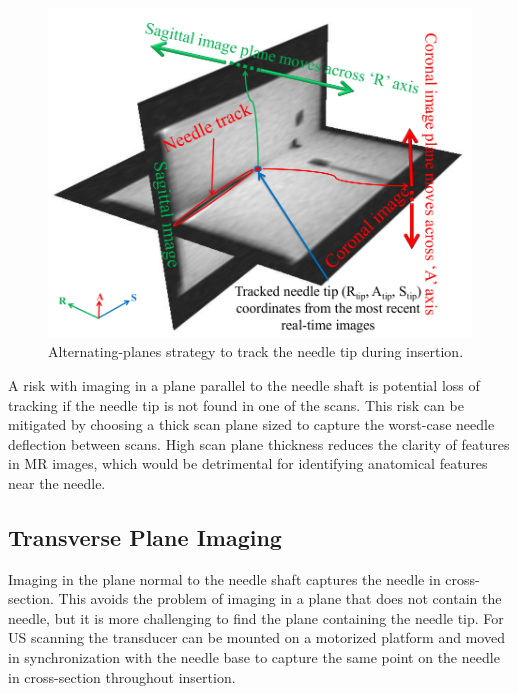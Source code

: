 \begin{figure}[h]
\includegraphics[width=1.0\textwidth]{Fig/chap2/patel_mri_tracking.png}
\caption{Alternating-planes strategy to track the needle tip during insertion\cite{patel_closed-loop_2015}.}
\label{fig:needle_guide}
\end{figure}

A risk with imaging in a plane parallel to the needle shaft is potential loss of tracking if the needle tip is not found in one of the scans. This risk can be mitigated by choosing a thick scan plane sized to capture the worst-case needle deflection between scans. High scan plane thickness reduces the clarity of features in MR images, which would be detrimental for identifying anatomical features near the needle.


\subsection{Transverse Plane Imaging}
Imaging in the plane normal to the needle shaft captures the needle in cross-section. This avoids the problem of imaging in a plane that does not contain the needle, but it is more challenging to find the plane containing the needle tip. For US scanning the transducer can be mounted on a motorized platform and moved in synchronization with the needle base to capture the same point on the needle in cross-section throughout insertion\cite{carriere_needle_2015,rossa_adaptive_2016}.


